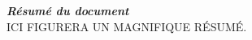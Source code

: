 \thispagestyle{empty}
\vspace*{10mm}

\textbf{\emph{\textcolor{onitu}{\large{Résumé du document} } } }\\

ICI FIGURERA UN MAGNIFIQUE RÉSUMÉ.

\clearpage
